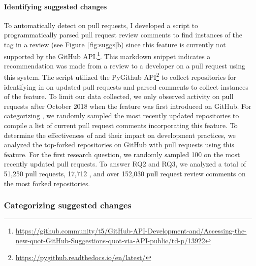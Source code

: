 \paragraph*{Identifying suggested changes}

To automatically detect \suggs on pull requests, I developed a script to programmatically parsed pull request review comments to find instances of the \suggtag tag in a review (see Figure~\ref{fig:suggs}b) since this feature is currently not supported by the GitHub API.\footnote{\url{https://github.community/t5/GitHub-API-Development-and/Accessing-the-new-quot-GitHub-Suggestions-quot-via-API-public/td-p/13922}}. This markdown snippet indicates a recommendation was made from a review to a developer on a pull request using this system. The script utilized the PyGithub API\footnote{\url{https://pygithub.readthedocs.io/en/latest/}} to collect repositories for identifying \sugg in on updated pull requests and parsed comments to collect instances of the \suggs feature. To limit our data collected, we only observed activity on pull requests after October 2018 when the \sugg feature was first introduced on GitHub. For categorizing \sugg, we randomly sampled the most recently updated repositories to compile a list of current pull request comments incorporating this feature. To determine the effectiveness of \sugg and their impact on development practices, we analyzed the top-forked repositories on GitHub with pull requests using this feature. For the first research question, we randomly sampled 100 \sugg on the most recently updated pull requests. To answer RQ2 and RQ3, we analyzed a total of 51,250 pull requests, 17,712 \sugg, and over 152,030 pull request review comments on the most forked repositories.


\subsubsection{Categorizing suggested changes}

